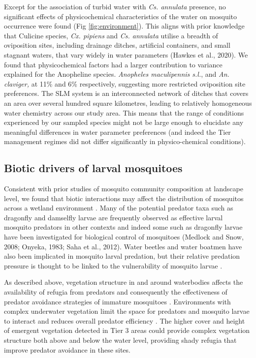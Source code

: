 \documentclass[lineno,sn-basic]{sn-jnl}%
\begin{document}
Except for the association of turbid water with \textit{Cs. annulata} presence, no significant effects of physicochemical characteristics of the water on mosquito occurrence were found (Fig \ref{fig:environment}). This aligns with prior knowledge that Culicine species, \textit{Cx. pipiens }and \textit{Cs. annulata} utilise a breadth of oviposition sites, including drainage ditches, artificial containers, and small stagnant waters, that vary widely in water parameters (Hawkes et al., 2020). We found that physicochemical factors had a larger contribution to variance explained for the Anopheline species. \textit{Anopheles maculipennis s.l.}, and \textit{An. claviger,} at 11\% and 6\% respectively, suggesting more restricted oviposition site preferences. The SLM system is an interconnected network of ditches that covers an area over several hundred square kilometres, leading to relatively homogeneous water chemistry across our study area. This means that the range of conditions experienced by our sampled species might not be large enough to elucidate any meaningful differences in water parameter preferences (and indeed the Tier management regimes did not differ significantly in physico-chemical conditions). 

\subsection{Biotic drivers of larval mosquitoes}

Consistent with prior studies of mosquito community composition at landscape level, we found that biotic interactions may affect the distribution of mosquitos across a wetland environment \citep{goldingIdentifyingBioticInteractions2015a}. Many of the potential predator taxa such as dragonfly and damselfly larvae are frequently observed as effective larval mosquito predators in other contexts and indeed some such as dragonfly larvae have been investigated for biological control of mosquitoes (Medlock and Snow, 2008; Onyeka, 1983; Saha et al., 2012). Water beetles and water boatmen have also been implicated in mosquito larval predation, but their relative predation pressure is thought to be linked to the vulnerability of mosquito larvae \citep{jeffriesIndividualVulnerabilityPredation1988a, medlockNaturalPredatorsParasites2008}. 

As described above, vegetation structure in and around waterbodies affects the availability of refugia from predators and consequently the effectiveness of predator avoidance strategies of immature mosquitoes \citep{sahaHabitatComplexityReduces2009}. Environments with complex underwater vegetation limit the space for predators and mosquito larvae to interact and reduces overall predator efficiency \citep{sahaHabitatComplexityReduces2009, sunaharaHabitatSizeFactor2002}. The higher cover and height of emergent vegetation detected in Tier 3 areas could provide complex vegetation structure both above and below the water level, providing shady refugia that improve predator avoidance in these sites. 
\end{document}
